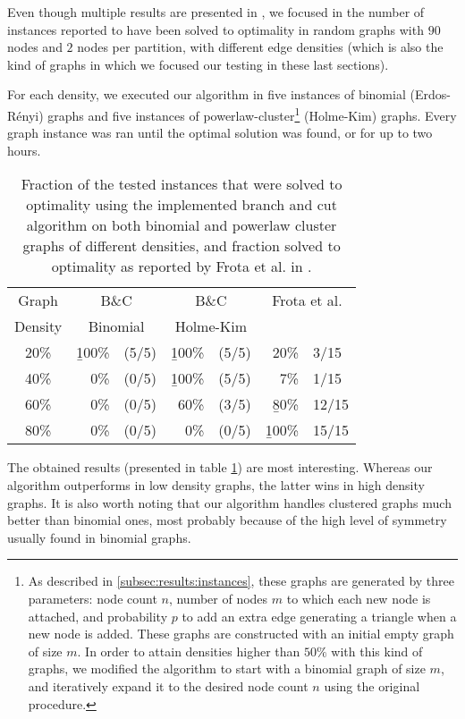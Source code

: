 Even though multiple results are presented in \cite{frota2010branch}, we focused in the number of instances reported to have been solved to optimality in random graphs with $90$ nodes and $2$ nodes per partition, with different edge densities (which is also the kind of graphs in which we focused our testing in these last sections). 

For each density, we executed our algorithm in five instances of binomial (Erdos-R\'enyi) graphs and five instances of powerlaw-cluster\footnote{As described in \ref{subsec:results:instances}, these graphs are generated by three parameters: node count $n$, number of nodes $m$ to which each new node is attached, and probability $p$ to add an extra edge generating a triangle when a new node is added. These graphs are constructed with an initial empty graph of size $m$. In order to attain densities higher than $50\%$ with this kind of graphs, we modified the algorithm to start with a binomial graph of size $m$, and iteratively expand it to the desired node count $n$ using the original procedure.} (Holme-Kim) graphs. Every graph instance was ran until the optimal solution was found, or for up to two hours.

\begin{table}[h]
\centering
\begin{tabular}{|c|rl|rl|rl|}
\hline
Graph & \multicolumn{2}{|c|}{B\&C} & \multicolumn{2}{|c|}{B\&C} & \multicolumn{2}{|c|}{Frota et al.} \\
Density & \multicolumn{2}{|c|}{Binomial} & \multicolumn{2}{|c|}{Holme-Kim} & \multicolumn{2}{|c|}{} \\
\hline
20\% & \b{100\%} & (5/5) & \b{100\%} & (5/5) & 20\% & 3/15 \\
40\% & 0\% & (0/5) & \b{100\%} & (5/5) & 7\% & 1/15 \\
60\% & 0\% & (0/5) & 60\% & (3/5) & \b{80\%} & 12/15 \\
80\% & 0\% & (0/5) & 0\% & (0/5) & \b{100\%} & 15/15 \\
\hline 
\end{tabular} 
\caption{Fraction of the tested instances that were solved to optimality using the implemented branch and cut algorithm on both binomial and powerlaw cluster graphs of different densities, and fraction solved to optimality as reported by Frota et al. in \cite{frota2010branch}.}
\label{table:final:frotaetal}
\end{table}

The obtained results (presented in table \ref{table:final:frotaetal}) are most interesting. Whereas our algorithm outperforms \cite{frota2010branch} in low density graphs, the latter wins in high density graphs. It is also worth noting that our algorithm handles clustered graphs much better than binomial ones, most probably because of the high level of symmetry usually found in binomial graphs.


